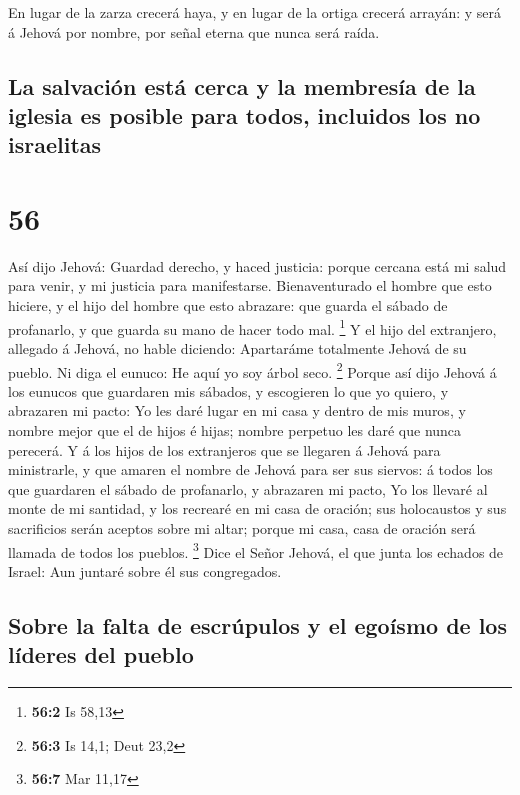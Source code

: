  En lugar de la zarza crecerá haya, y en lugar de la ortiga
crecerá arrayán: y será á Jehová por nombre, por señal eterna que nunca
será raída.

\hypertarget{la-salvaciuxf3n-estuxe1-cerca-y-la-membresuxeda-de-la-iglesia-es-posible-para-todos-incluidos-los-no-israelitas}{%
\subsection{La salvación está cerca y la membresía de la iglesia es
posible para todos, incluidos los no
israelitas}\label{la-salvaciuxf3n-estuxe1-cerca-y-la-membresuxeda-de-la-iglesia-es-posible-para-todos-incluidos-los-no-israelitas}}

\hypertarget{section-55}{%
\section{56}\label{section-55}}

 Así dijo Jehová: Guardad derecho, y haced justicia: porque
cercana está mi salud para venir, y mi justicia para manifestarse.
 Bienaventurado el hombre que esto hiciere, y el hijo del
hombre que esto abrazare: que guarda el sábado de profanarlo, y que
guarda su mano de hacer todo mal. \footnote{\textbf{56:2} Is 58,13}
 Y el hijo del extranjero, allegado á Jehová, no hable
diciendo: Apartaráme totalmente Jehová de su pueblo. Ni diga el eunuco:
He aquí yo soy árbol seco. \footnote{\textbf{56:3} Is 14,1; Deut 23,2}
 Porque así dijo Jehová á los eunucos que guardaren mis
sábados, y escogieren lo que yo quiero, y abrazaren mi pacto:
 Yo les daré lugar en mi casa y dentro de mis muros, y
nombre mejor que el de hijos é hijas; nombre perpetuo les daré que nunca
perecerá.  Y á los hijos de los extranjeros que se llegaren
á Jehová para ministrarle, y que amaren el nombre de Jehová para ser sus
siervos: á todos los que guardaren el sábado de profanarlo, y abrazaren
mi pacto,  Yo los llevaré al monte de mi santidad, y los
recrearé en mi casa de oración; sus holocaustos y sus sacrificios serán
aceptos sobre mi altar; porque mi casa, casa de oración será llamada de
todos los pueblos. \footnote{\textbf{56:7} Mar 11,17}  Dice
el Señor Jehová, el que junta los echados de Israel: Aun juntaré sobre
él sus congregados.

\hypertarget{sobre-la-falta-de-escruxfapulos-y-el-egouxedsmo-de-los-luxedderes-del-pueblo}{%
\subsection{Sobre la falta de escrúpulos y el egoísmo de los líderes del
pueblo}\label{sobre-la-falta-de-escruxfapulos-y-el-egouxedsmo-de-los-luxedderes-del-pueblo}}

